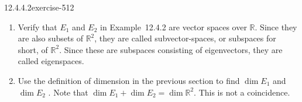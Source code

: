 \documentclass[twoside,10pt,]{book}
\numberwithin{equation}{section}
\begin{document}
\begin{divisionsolution}{12.4.4.2}{}{exercise-512}%
\hypertarget{p-4622}{}%
\leavevmode%
\begin{enumerate}[label=(\alph*)]
\item\hypertarget{li-2105}{}\hypertarget{p-4623}{}%
Verify that \(E_1\) and \(E_2\) in Example~12.4.2 are vector spaces over \(\mathbb{R}\).  Since they are also subsets of \(\mathbb{R}^2\), they are called subvector-spaces, or subspaces for short, of \(\mathbb{R}^2\). Since these are subspaces consisting of eigenvectors, they are called eigenspaces.%
\item\hypertarget{li-2106}{}\hypertarget{p-4624}{}%
Use the definition of dimension in the previous section to find \(\dim E_1\) and \(\dim  E_2\) . Note that \(\dim E_1 + \dim E_2 = \dim \mathbb{R}^2\). This is not a coincidence.%
\end{enumerate}
%
\end{divisionsolution}%
\end{document}
